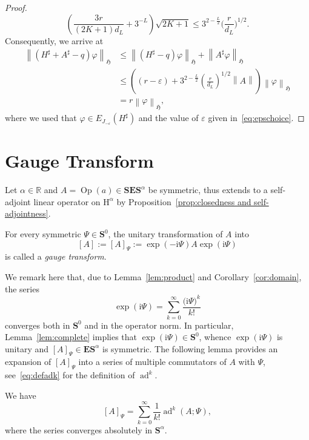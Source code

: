 \documentclass[AHL,Unicode,longabstracts,published]{cedram}
\DeclareMathOperator{\ad}{ad}
\DeclareMathOperator{\Op}{Op}
\newcommand{\rmi}{\mathrm{i}}
\renewcommand{\mathsf}{\mathrm}
\newcommand{\sfH}{\mathsf{H}}
\newcommand{\R}{\mathbb R}
\newcommand{\BE}{\mathbf E}
\newcommand{\BS}{\mathbf S}
\newcommand{\FH}{\mathfrak H}
\renewcommand{\phi}{\varphi}
\newcommand{\eps}{\varepsilon}
\newcommand{\norm}[1]{\left\| #1 \right\|}
\begin{document}
\begin{proof}
\begin{equation}\label{eq:boundsecterm}
\left(\frac{3r}{(2K + 1)d_L} + 3^{-L}\right)\sqrt{2K+1} \le 3^{2 -
\frac{L}{2}} \Big(\frac{r}{d_L}\Big)^{1/2}.
\end{equation}
Consequently, we arrive at
\begin{equation}\label{eq:therightthing}
\begin{split}
\norm{\left(H^\sharp + A^\sharp - q\right) \phi}_\FH &\le \norm{\left(H^\sharp - q\right)
\phi}_\FH+ \norm{A^\sharp\phi}_\FH \\
&\le \left((r - \eps) + 3^{2 - \frac{L}{2}} \left(\frac{r}{d_L}\right)^{1/2}\norm{A}\right)
\norm{\phi}_\FH\\
&= r \norm \phi_\FH,
\end{split}
\end{equation}
where we used that $\phi\in E_{J_{-\eps}}(H^\sharp)$ and the value of $\eps$ given in~\eqref{eq:epschoice}.
\end{proof}

\section{Gauge Transform}\label{sec:gt}

Let $\alpha\in \R$ and $A = \Op(a) \in \BS\BE\BS^\alpha$ be symmetric, thus extends to a self-adjoint linear operator on $\sfH^{\alpha}$ by Proposition~\ref{prop:closedness and self-adjointness}.

\begin{defi}
For every symmetric $\Psi\in\BS^0$, the unitary transformation of $A$ into
\[
[A] := [A]_\Psi := \exp(- \rmi \Psi) A \exp(\rmi \Psi)
\]
is called a
\emph{gauge transform}.
\end{defi}

\noindent We remark here that, due to Lemma~\ref{lem:product} and Corollary~\ref{cor:domain}, the series
\begin{equation}\label{eq:exppsi}
\exp(\rmi\Psi)=\sum\limits_{k=0}^\infty \frac{\big(\rmi\Psi\big)^k}{k!}
\end{equation}
converges both in $\BS^0$ and in the operator norm. In particular, Lemma~\ref{lem:complete} implies that $\exp(\rmi\Psi)\in\BS^0$, whence $\exp(\rmi\Psi)$ is unitary and $[A]_\Psi\in\BE\BS^\alpha$ is symmetric. The following lemma provides an expansion of $[A]_\Psi$ into a series of multiple commutators of $A$ with $\Psi$, see~\eqref{eq:defadk} for the definition of $\ad^k$.
\begin{lemm}\label{lem:A'series}
We have
\begin{equation}\label{eq:H'formalseries}
[A]_\Psi = \sum_{k = 0}^\infty \frac{1}{k!}\ad^k(A;\Psi),
\end{equation}
where the series converges absolutely in $\BS^\alpha$.
\end{lemm}
\end{document}
